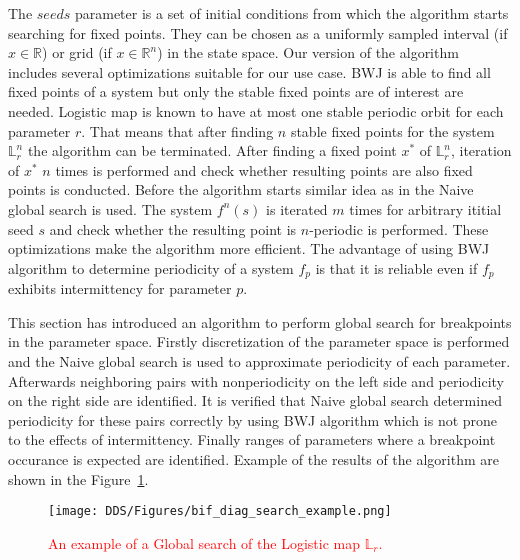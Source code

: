The $seeds$ parameter is a set of initial conditions from which the algorithm starts searching for fixed points.
They can be chosen as a uniformly sampled interval (if $x \in \mathbb{R}$) or grid (if $x \in \mathbb{R}^{n}$) in the state space.
Our version of the algorithm includes several optimizations suitable for our use case.
BWJ is able to find all fixed points of a system but only the stable fixed points are of interest are needed.
Logistic map is known to have at most one stable periodic orbit for each parameter $r$.
That means that after finding $n$ stable fixed points for the system $\mathbb{L}_{r}^{n}$ the algorithm can be terminated.
After finding a fixed point $x^{*}$ of $\mathbb{L}_{r}^{n}$, iteration of $x^{*}$ $n$ times is performed and check whether resulting points are also fixed points is conducted.
Before the algorithm starts similar idea as in the Naive global search is used.
The system $f^{n}(s)$ is iterated $m$ times for arbitrary ititial seed $s$ and check whether the resulting point is $n$-periodic is performed.
These optimizations make the algorithm more efficient.
The advantage of using BWJ algorithm to determine periodicity of a system $f_{p}$ is that it is reliable even if $f_{p}$ exhibits intermittency for parameter $p$.
\par
This section has introduced an algorithm to perform global search for breakpoints in the parameter space.
Firstly discretization of the parameter space is performed and the Naive global search is used to approximate periodicity of each parameter.
Afterwards neighboring pairs with nonperiodicity on the left side and periodicity on the right side are identified.
It is verified that Naive global search determined periodicity for these pairs correctly by using BWJ algorithm which is not prone to the effects of intermittency.
Finally ranges of parameters where a breakpoint occurance is expected are identified.
Example of the results of the algorithm are shown in the Figure~\ref{fig:bif_diag_search_example}.

\begin{figure}[!h]
    \centering
    \texttt{[image: DDS/Figures/bif\_diag\_search\_example.png]}
    \caption{
        \textcolor{red}{
        An example of a Global search of the Logistic map $\mathbb{L}_{r}$.
        }
    }
    \label{fig:bif_diag_search_example}
\end{figure}

